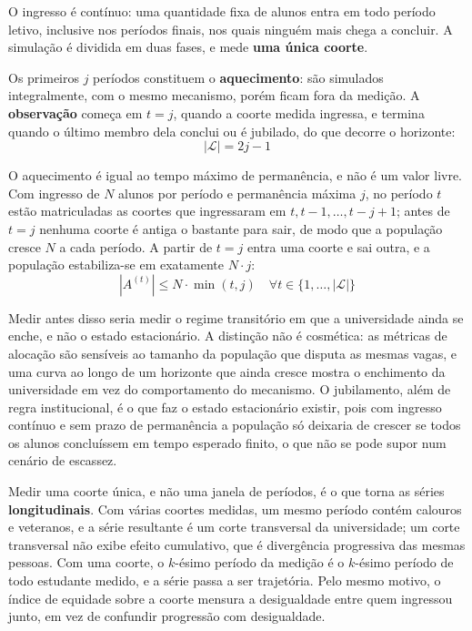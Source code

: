 \documentclass[
    12pt,
    openany,
    oneside,
    a4paper,
    english,
    brazil
]{abntex2}
\begin{document}
O ingresso é contínuo: uma quantidade fixa de alunos entra em todo período letivo, inclusive nos períodos finais, nos quais ninguém mais chega a concluir. A simulação é dividida em duas fases, e mede \textbf{uma única coorte}.

Os primeiros $j$ períodos constituem o \textbf{aquecimento}: são simulados integralmente, com o mesmo mecanismo, porém ficam fora da medição. A \textbf{observação} começa em $t = j$, quando a coorte medida ingressa, e termina quando o último membro dela conclui ou é jubilado, do que decorre o horizonte:
\begin{equation}
    |\mathcal{L}| = 2j - 1
\end{equation}

O aquecimento é igual ao tempo máximo de permanência, e não é um valor livre. Com ingresso de $N$ alunos por período e permanência máxima $j$, no período $t$ estão matriculadas as coortes que ingressaram em $t, t-1, \dots, t-j+1$; antes de $t = j$ nenhuma coorte é antiga o bastante para sair, de modo que a população cresce $N$ a cada período. A partir de $t = j$ entra uma coorte e sai outra, e a população estabiliza-se em exatamente $N \cdot j$:
\begin{equation}
    \left| A^{(t)} \right| \leq N \cdot \min(t, j)
    \quad \forall t \in \{1, \dots, |\mathcal{L}|\}
\end{equation}

Medir antes disso seria medir o regime transitório em que a universidade ainda se enche, e não o estado estacionário. A distinção não é cosmética: as métricas de alocação são sensíveis ao tamanho da população que disputa as mesmas vagas, e uma curva ao longo de um horizonte que ainda cresce mostra o enchimento da universidade em vez do comportamento do mecanismo. O jubilamento, além de regra institucional, é o que faz o estado estacionário existir, pois com ingresso contínuo e sem prazo de permanência a população só deixaria de crescer se todos os alunos concluíssem em tempo esperado finito, o que não se pode supor num cenário de escassez.

Medir uma coorte única, e não uma janela de períodos, é o que torna as séries \textbf{longitudinais}. Com várias coortes medidas, um mesmo período contém calouros e veteranos, e a série resultante é um corte transversal da universidade; um corte transversal não exibe efeito cumulativo, que é divergência progressiva das mesmas pessoas. Com uma coorte, o $k$-ésimo período da medição é o $k$-ésimo período de todo estudante medido, e a série passa a ser trajetória. Pelo mesmo motivo, o índice de equidade sobre a coorte mensura a desigualdade entre quem ingressou junto, em vez de confundir progressão com desigualdade.
\end{document}
